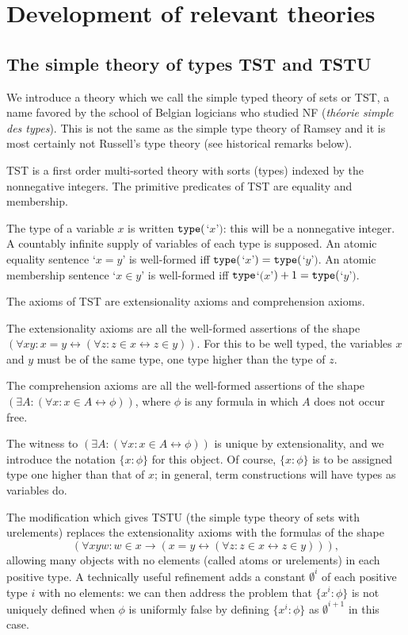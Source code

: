 \documentclass[112pt]{article}
\begin{document}
\newpage

\section{Development of relevant theories}



\subsection{The simple theory of types TST and TSTU}

We introduce a theory which we call the simple typed theory of sets or TST, a name favored by the school of Belgian logicians who studied NF ({\em th\'eorie simple des types}).  This is not the same as the simple type theory of Ramsey and it is most certainly not Russell's type theory  (see historical remarks below).

TST is a first order multi-sorted theory with sorts (types) indexed by the nonnegative integers.  The primitive predicates of TST are equality and membership.

The type of a variable $x$ is written ${\tt type}($`$x$'$)$:  this will be a nonnegative integer.   A countably infinite supply of variables of each type is supposed.  An atomic equality sentence `$x=y$' is well-formed iff ${\tt type}($`$x$'$)={\tt type}($`$y$'$)$.
An atomic membership sentence `$x \in y$' is well-formed iff ${\tt type}$`$(x$'$)+1 = {\tt type}($`$y$'$)$.

The axioms of TST are extensionality axioms and comprehension axioms.

The extensionality axioms are all the well-formed assertions of the shape $(\forall xy:x=y \leftrightarrow (\forall z:z \in x \leftrightarrow z\in y))$.  For this to be well typed, the variables
$x$ and $y$ must be of the same type, one type higher than the type of $z$.

The comprehension axioms are all the well-formed assertions of the shape $(\exists A:(\forall x:x \in A \leftrightarrow \phi))$, where $\phi$ is any formula in which $A$ does not occur free.

The witness to $(\exists A:(\forall x:x \in A \leftrightarrow \phi))$ is unique by extensionality, and we introduce the notation $\{x:\phi\}$ for this object.  Of course, $\{x:\phi\}$  is to be assigned type one higher than that of $x$;  in general, term constructions will have types as variables do.

The modification which gives TSTU (the simple type theory of sets with urelements) replaces the extensionality axioms with the formulas of the shape $$(\forall xyw:w \in x \rightarrow (x=y \leftrightarrow (\forall z:z \in x \leftrightarrow z\in y))),$$  allowing many objects with no elements (called atoms or urelements)  in each positive type.  A technically useful refinement adds a constant $\emptyset^i$ of each positive type $i$ with no elements:  we can then address the problem that $\{x^i:\phi\}$ is not uniquely defined when $\phi$ is uniformly false by defining $\{x^i:\phi\}$ as $\emptyset^{i+1}$ in this case.
\end{document}

